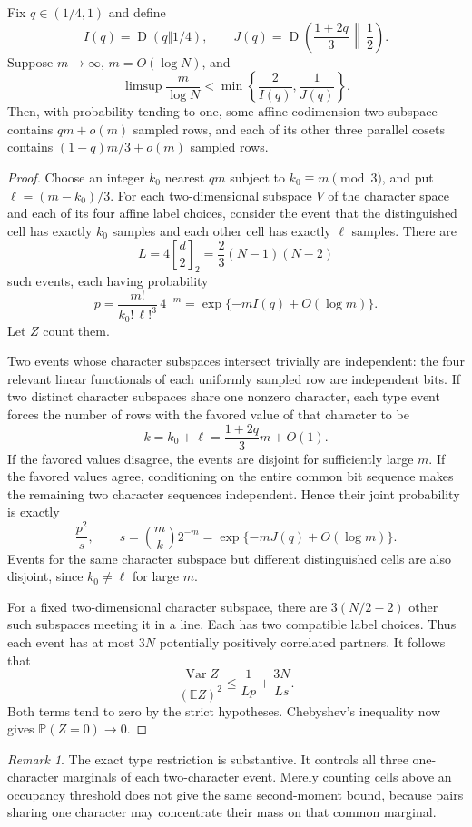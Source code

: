 \documentclass[11pt]{article}
\theoremstyle{remark}\newtheorem{remark}[theorem]{Remark}
\newcommand{\E}{\mathbb E}\newcommand{\Prob}{\mathbb P}
\newcommand{\Var}{\operatorname{Var}}\newcommand{\KL}{\operatorname{D}}
\begin{document}
\begin{lemma}\label{lem:types}
Fix $q\in(1/4,1)$ and define
\[
 I(q)=\KL(q\Vert1/4),\qquad
 J(q)=\KL\left(\frac{1+2q}{3}\,\middle\Vert\,\frac12\right).
\]
Suppose $m\to\infty$, $m=O(\log N)$, and
\[
 \limsup\frac{m}{\log N}<\min\left\{\frac2{I(q)},\frac1{J(q)}\right\}.
\]
Then, with probability tending to one, some affine codimension-two subspace contains $qm+o(m)$ sampled rows, and each of its other three parallel cosets contains $(1-q)m/3+o(m)$ sampled rows.
\end{lemma}
\begin{proof}
Choose an integer $k_0$ nearest $qm$ subject to $k_0\equiv m\pmod3$, and put $\ell=(m-k_0)/3$. For each two-dimensional subspace $V$ of the character space and each of its four affine label choices, consider the event that the distinguished cell has exactly $k_0$ samples and each other cell has exactly $\ell$ samples. There are
\[
 L=4{d\brack2}_2=\frac23(N-1)(N-2)
\]
such events, each having probability
\[
 p=\frac{m!}{k_0!\,\ell!^3}\,4^{-m}
   =\exp\{-mI(q)+O(\log m)\}.
\]
Let $Z$ count them.

Two events whose character subspaces intersect trivially are independent: the four relevant linear functionals of each uniformly sampled row are independent bits. If two distinct character subspaces share one nonzero character, each type event forces the number of rows with the favored value of that character to be
\[
 k=k_0+\ell=\frac{1+2q}{3}m+O(1).
\]
If the favored values disagree, the events are disjoint for sufficiently large $m$. If the favored values agree, conditioning on the entire common bit sequence makes the remaining two character sequences independent. Hence their joint probability is exactly
\[
 \frac{p^2}{s},\qquad
 s=\binom mk 2^{-m}=\exp\{-mJ(q)+O(\log m)\}.
\]
Events for the same character subspace but different distinguished cells are also disjoint, since $k_0\ne\ell$ for large $m$.

For a fixed two-dimensional character subspace, there are $3(N/2-2)$ other such subspaces meeting it in a line. Each has two compatible label choices. Thus each event has at most $3N$ potentially positively correlated partners. It follows that
\[
 \frac{\Var Z}{(\E Z)^2}\le\frac1{Lp}+\frac{3N}{Ls}.
\]
Both terms tend to zero by the strict hypotheses. Chebyshev's inequality now gives $\Prob(Z=0)\to0$.
\end{proof}

\begin{remark}
The exact type restriction is substantive. It controls all three one-character marginals of each two-character event. Merely counting cells above an occupancy threshold does not give the same second-moment bound, because pairs sharing one character may concentrate their mass on that common marginal.
\end{remark}
\end{document}
